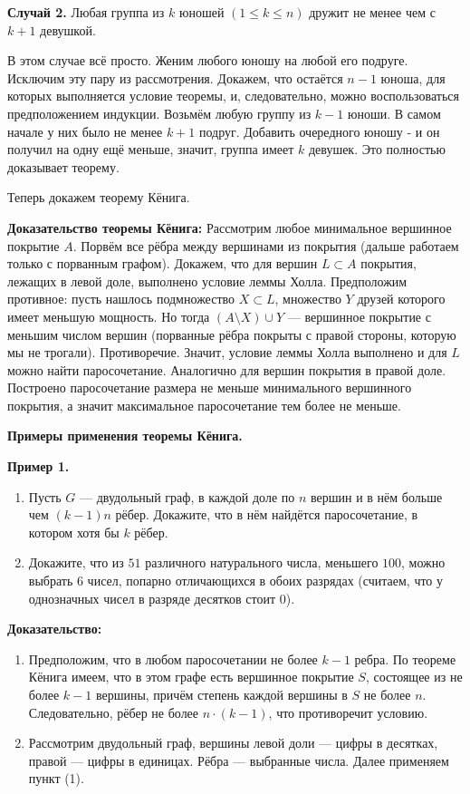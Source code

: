 \textbf{Случай 2.} Любая группа из $k$ юношей $(1 \leq k \leq n)$ дружит не менее чем с $k + 1$ девушкой.

В этом случае всё просто. Женим любого юношу на любой его подруге. Исключим эту пару из рассмотрения. Докажем, что остаётся $n-1$ юноша, для которых выполняется условие теоремы, и, следовательно, можно воспользоваться предположением индукции. Возьмём любую группу из $k - 1$ юноши. В самом начале у них было не менее $k+1$ подруг. Добавить очередного юношу - и он получил на одну ещё меньше, значит, группа имеет $k$ девушек. Это полностью доказывает теорему.

Теперь докажем теорему Кёнига.

\textbf{Доказательство теоремы Кёнига:}
Рассмотрим любое минимальное вершинное покрытие $A$. Порвём все рёбра между вершинами из покрытия (дальше работаем только с порванным графом). Докажем, что для вершин $L \subset A$ покрытия, лежащих в левой доле, выполнено условие леммы Холла. Предположим противное: пусть нашлось подмножество $X \subset L$, множество $Y$ друзей которого имеет меньшую мощность. Но тогда $(A \setminus X) \cup Y$ — вершинное покрытие с меньшим числом вершин (порванные рёбра покрыты с правой стороны, которую мы не трогали). Противоречие. Значит, условие леммы Холла выполнено и для $L$ можно найти паросочетание. Аналогично для вершин покрытия в правой доле. Построено паросочетание размера не меньше минимального вершинного покрытия, а значит максимальное паросочетание тем более не меньше.


\newpage

\hspace{3mm}

\textbf{\Large Примеры применения теоремы Кёнига.}

\textbf{Пример 1.}
\begin{enumerate}
    \item  Пусть $G$ --- двудольный граф, в каждой доле по $n$ вершин и в нём больше чем $(k - 1)n$   рёбер. Докажите, что в нём найдётся паросочетание, в котором хотя бы $k$ рёбер.
    \item Докажите, что из $51$   различного натурального числа, меньшего $100$,   можно выбрать $6$ чисел, попарно отличающихся в обоих разрядах (считаем, что у однозначных чисел в разряде десятков стоит $0$).
\end{enumerate}

\textbf{Доказательство:} 
\begin{enumerate}
    \item Предположим, что в любом паросочетании не более $k -1$   ребра. По теореме Кёнига имеем, что в этом графе есть вершинное покрытие $S$,   состоящее из не более $k - 1$   вершины, причём степень каждой вершины в $S$   не более $n$.   Следовательно, рёбер не более $n \cdot (k - 1)$,   что противоречит условию.
    \item Рассмотрим двудольный граф, вершины левой доли --- цифры в десятках, правой --- цифры в единицах. Рёбра --- выбранные числа. Далее применяем пункт (1).  
\end{enumerate}

